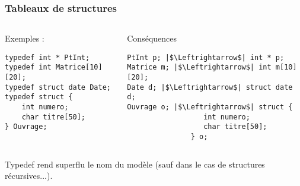 \documentclass[table,handout,tikz,12pt,svgnames]{beamer}
\begin{document}
\begin{frame}[fragile=singleslide]
	\frametitle{Tableaux de structures}
		\vspace{-0.2cm}
	  \begin{columns}
	  	\begin{column}{0.45\textwidth}
		  	Exemples :
			\begin{verbatim}
typedef int * PtInt;
typedef int Matrice[10][20];
typedef struct date Date;
typedef struct {
    int numero;
    char titre[50];
} Ouvrage;
			\end{verbatim}
		\end{column}
		\vrule{}
		\begin{column}{0.55\textwidth}
			Conséquences
			\begin{verbatim}
PtInt p; |$\Leftrightarrow$| int * p;
Matrice m; |$\Leftrightarrow$| int m[10][20];
Date d; |$\Leftrightarrow$| struct date d;
Ouvrage o; |$\Leftrightarrow$| struct {
                  int numero;
                  char titre[50];
               } o;
			\end{verbatim}
	    \end{column}
	\end{columns}
	\vspace{1cm}
	Typedef rend superflu le nom du modèle (sauf dans le cas de structures récursives...).
	
\end{frame}
\end{document}
